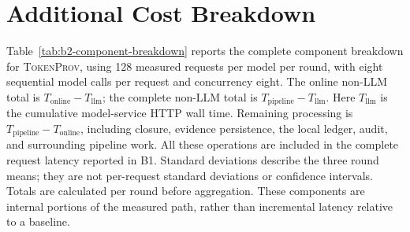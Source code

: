\documentclass[conference]{IEEEtran}
\begin{document}
\onecolumn
\appendices
\section{Additional Cost Breakdown}
Table~\ref{tab:b2-component-breakdown} reports the complete component breakdown for
\textsc{TokenProv}, using 128 measured requests per model per round, with eight
sequential model calls per request and concurrency eight.
The online non-LLM total is $T_{\mathrm{online}}-T_{\mathrm{llm}}$; the complete
non-LLM total is $T_{\mathrm{pipeline}}-T_{\mathrm{llm}}$.
Here $T_{\mathrm{llm}}$ is the cumulative model-service HTTP wall time.
Remaining processing is $T_{\mathrm{pipeline}}-T_{\mathrm{online}}$, including
closure, evidence persistence, the local ledger, audit, and surrounding pipeline work.
All these operations are included in the complete request latency reported in B1.
Standard deviations describe the three round means; they are not per-request
standard deviations or confidence intervals. Totals are calculated per round
before aggregation. These components are internal portions of the measured path,
rather than incremental latency relative to a baseline.

\end{document}
